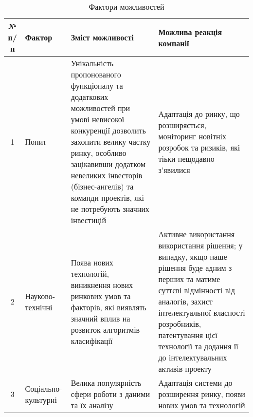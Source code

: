 \begin{table}
	\begin{tabularx}{\textwidth}{|c|X|X|X|}
    \hline
    № п/п & Фактор & Зміст можливості & Можлива реакція компанії \\ \hline
    1 & Попит & Унікальність пропонованого функціоналу та додаткових можливостей при умові невисокої конкуренції дозволить захопити велику частку ринку, особливо зацікавивши додатком невеликих інвесторів (бізнес-ангелів) та команди проектів, які не потребують значних інвестицій & Адаптація до ринку, що розширяється, моніторинг новітніх розробок та ризиків, які тіьки нещодавно з'явилися \\ \hline
    2 & Науково-технічні & Поява нових технологій, виникнення нових ринкових умов та факторів, які виявлять значний вплив на розвиток алгоритмів класифікації  & Активне використання використання рішення; у випадку, якщо наше рішення буде адним з перших та матиме суттєві відмінності від аналогів, захист інтелектуальної власності розробників, патентування цієї технології та додання її до інтелектувальних активів проекту \\ \hline
    3 & Соціально-культурні & Велика популярність сфери роботи з даними та їх аналізу & Адаптація системи до розширення ринку, появи нових умов та технологій \\ \hline
    \hline
    \end{tabularx}
\caption{Фактори можливостей} \label{tab:sometab}
\end{table}

